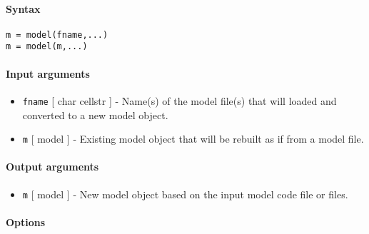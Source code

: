 


	\paragraph{Syntax}\label{syntax}

\begin{verbatim}
m = model(fname,...)
m = model(m,...)
\end{verbatim}

\paragraph{Input arguments}\label{input-arguments}

\begin{itemize}
\item
  \texttt{fname} {[} char \textbar{} cellstr {]} - Name(s) of the model
  file(s) that will loaded and converted to a new model object.
\item
  \texttt{m} {[} model {]} - Existing model object that will be rebuilt
  as if from a model file.
\end{itemize}

\paragraph{Output arguments}\label{output-arguments}

\begin{itemize}
\itemsep1pt\parskip0pt
\item
  \texttt{m} {[} model {]} - New model object based on the input model
  code file or files.
\end{itemize}

\paragraph{Options}\label{options}

